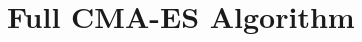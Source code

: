 \documentclass[letterpaper]{article}
\begin{document}
	
	
	
	\newpage \phantom{blahblah} \newpage
	
	\onecolumn
	
	\appendix
	
	\section{Full CMA-ES Algorithm}
	
\end{document}
